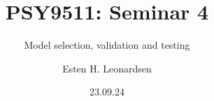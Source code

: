 \documentclass[10pt]{beamer}
\title{PSY9511: Seminar 4}
\subtitle{Model selection, validation and testing}
\author{Esten H. Leonardsen}
\date{23.09.24}
\begin{document}
	\begin{frame}
	 	\titlepage
	\end{frame}





\end{document}
